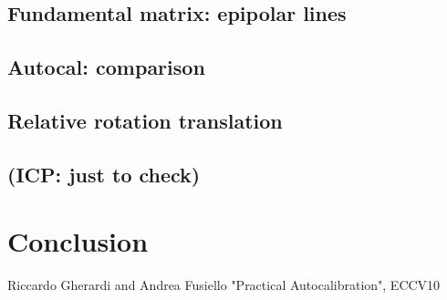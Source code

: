 \documentclass[14pt]{article}
\begin{document}
\subsection{Fundamental matrix: epipolar lines}
\subsection{Autocal: comparison}
\subsection{Relative rotation translation}
\subsection*{(ICP: just to check)}
\section{Conclusion}

\begin{thebibliography}{100}
    \addtolength{\leftmargin}{0.2in}
    \setlength{\itemindent}{-0.2in}

     Riccardo Gherardi and Andrea Fusiello "Practical Autocalibration", ECCV10
\end{thebibliography}
\end{document}
